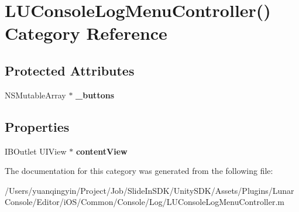 \hypertarget{category_l_u_console_log_menu_controller_07_08}{}\section{L\+U\+Console\+Log\+Menu\+Controller() Category Reference}
\label{category_l_u_console_log_menu_controller_07_08}
\subsection*{Protected Attributes}
\begin{DoxyCompactItemize}
\item 
\mbox{\label{category_l_u_console_log_menu_controller_07_08_a3745706e78f068c50f008a6d9080a077}} 
N\+S\+Mutable\+Array $\ast$ {\bfseries \+\_\+buttons}
\end{DoxyCompactItemize}
\subsection*{Properties}
\begin{DoxyCompactItemize}
\item 
\mbox{\label{category_l_u_console_log_menu_controller_07_08_a47ffd662f5d12401442ac037987cdd7b}} 
I\+B\+Outlet U\+I\+View $\ast$ {\bfseries content\+View}
\end{DoxyCompactItemize}


The documentation for this category was generated from the following file\+:\begin{DoxyCompactItemize}
\item 
/\+Users/yuanqingyin/\+Project/\+Job/\+Slide\+In\+S\+D\+K/\+Unity\+S\+D\+K/\+Assets/\+Plugins/\+Lunar\+Console/\+Editor/i\+O\+S/\+Common/\+Console/\+Log/L\+U\+Console\+Log\+Menu\+Controller.\+m\end{DoxyCompactItemize}
